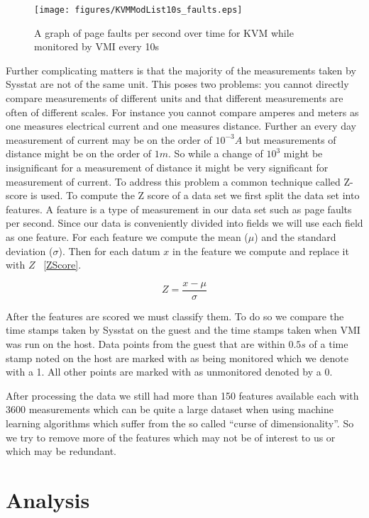 \begin{figure}
	  \centering
	  \texttt{[image: figures/KVMModList10s\_faults.eps]}
	  \caption{A graph of page faults per second over time for KVM while monitored by VMI every 10s}
	  \label{PageFaults}
\end{figure}

Further complicating matters is that the majority of the measurements taken by Sysstat are not of the same unit. This poses two problems: you cannot directly compare measurements of different units and that different measurements are often of different scales. For instance you cannot compare amperes and meters as one measures electrical current and one measures distance. Further an every day measurement of current may be on the order of $10^{-3}A$ but measurements of distance might be on the order of $1m$. So while a change of $10^3$ might be insignificant for a measurement of distance it might be very significant for measurement of current. To address this problem a common technique called Z-score is used. To compute the Z score of a data set we first split the data set into features. A feature is a type of measurement in our data set such as page faults per second. Since our data is conveniently divided into fields we will use each field as one feature. For each feature we compute the mean ($\mu$) and the standard deviation ($\sigma$). Then for each datum $x$ in the feature we compute and replace it with $Z$ ~\ref{ZScore}.


\begin{equation}\label{ZScore}
	Z = \frac{x-\mu}{\sigma}
\end{equation}

After the features are scored we must classify them. To do so we compare the time stamps taken by Sysstat on the guest and the time stamps taken when VMI was run on the host. Data points from the guest that are within $0.5s$ of a time stamp noted on the host are marked with as being monitored which we denote with a 1. All other points are marked with as unmonitored denoted by a 0. 


After processing the data we still had more than 150 features available each with 3600 measurements which can be quite a large dataset when using machine learning algorithms which suffer from the so called ``curse of dimensionality''. So we try to remove more of the features which may not be of interest to us or which may be redundant. 


\section{Analysis}
